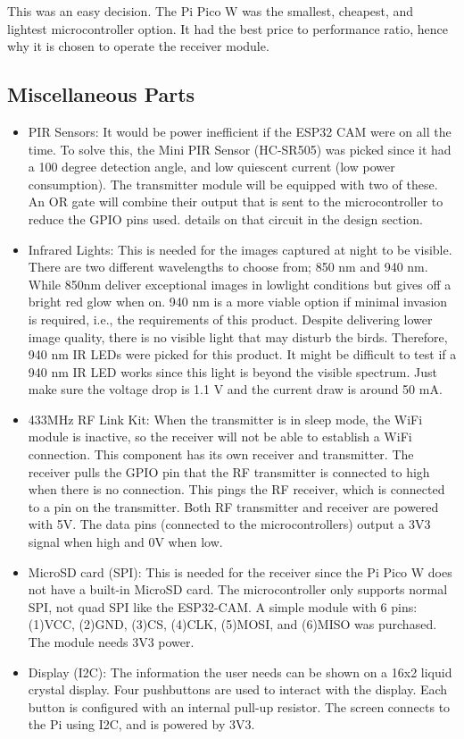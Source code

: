 \documentclass[class=report,11pt,crop=false]{standalone}
\begin{document}
This was an easy decision. The Pi Pico W was the smallest, cheapest, and lightest microcontroller option. It had the best price to performance ratio, hence why it is chosen to operate the receiver module. 

\subsection{Miscellaneous Parts}
\begin{itemize}
    \item PIR Sensors: It would be power inefficient if the ESP32 CAM were on all the time. To solve this, the Mini PIR Sensor (HC-SR505) was picked since it had a 100 degree detection angle, and low quiescent current (low power consumption). The transmitter module will be equipped with two of these. An OR gate will combine their output that is sent to the microcontroller to reduce the GPIO pins used. details on that circuit in the design section. 
    \item Infrared Lights: This is needed for the images captured at night to be visible. There are two different wavelengths to choose from; 850 nm and 940 nm. While 850nm deliver exceptional images in lowlight conditions but gives off a bright red glow when on. 940 nm is a more viable option if minimal invasion is required, i.e., the requirements of this product. Despite delivering lower image quality, there is no visible light that may disturb the birds. Therefore, 940 nm IR LEDs were picked for this product. It might be difficult to test if a 940 nm IR LED works since this light is beyond the visible spectrum. Just make sure the voltage drop is 1.1 V and the current draw is around 50 mA. 
    \item 433MHz RF Link Kit: When the transmitter is in sleep mode, the WiFi module is inactive, so the receiver will not be able to establish a WiFi connection. This component has its own receiver and transmitter. The receiver pulls the GPIO pin that the RF transmitter is connected to high when there is no connection. This pings the RF receiver, which is connected to a pin on the transmitter. Both RF transmitter and receiver are powered with 5V. The data pins (connected to the microcontrollers) output a 3V3 signal when high and 0V when low. 
    \item MicroSD card (SPI): This is needed for the receiver since the Pi Pico W does not have a built-in MicroSD card. The microcontroller only supports normal SPI, not quad SPI like the ESP32-CAM. A simple module with 6 pins: (1)VCC, (2)GND, (3)CS, (4)CLK, (5)MOSI, and (6)MISO was purchased. The module needs 3V3 power. 
    \item Display (I2C): The information the user needs can be shown on a 16x2 liquid crystal display. Four pushbuttons are used to interact with the display. Each button is configured with an internal pull-up resistor. The screen connects to the Pi using I2C, and is powered by 3V3. 
\end{itemize}
\end{document}
